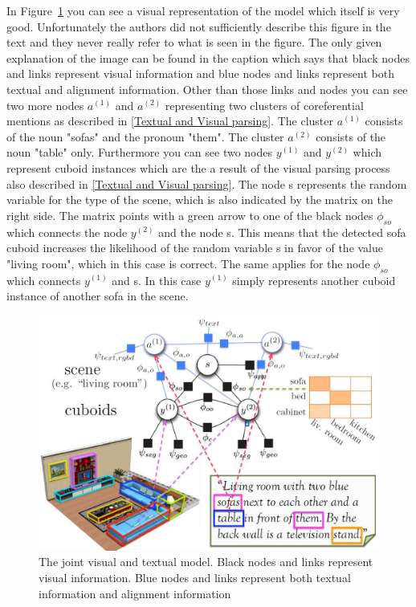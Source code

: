 \documentclass{utue} %
\begin{document}
In Figure~\ref{fig:model} you can see a visual representation of the model which itself is very good. Unfortunately the authors did not sufficiently describe this figure in the text and they never really refer to what is seen in the figure. The only given explanation of the image can be found in the caption which says that black nodes and links represent visual information and blue nodes and links represent both textual and alignment information. 
Other than those links and nodes you can see two more nodes $a^{(1)}$ and $a^{(2)}$ representing two clusters of coreferential mentions as described in \ref{Textual and Visual parsing}. The cluster $a^{(1)}$ consists of the noun "sofas" and the pronoun "them". The cluster $a^{(2)}$ consists of the noun "table" only. Furthermore you can see two nodes $y^{(1)}$ and $y^{(2)}$ which represent cuboid instances which are the a result of the visual parsing process also described in \ref{Textual and Visual parsing}. 
The node s represents the random variable for the type of the scene, which is also indicated by the matrix on the right side. The matrix points with a green arrow to one of the black nodes $\phi_{so}$ which connects the node $y^{(2)}$ and the node s. This means that the detected sofa cuboid increases the likelihood of the random variable s in favor of the value "living room", which in this case is correct. The same applies for the node $\phi_{so}$ which connects $y^{(1)}$ and s. In this case $y^{(1)}$ simply represents another cuboid instance of another sofa in the scene.

\begin{figure}[h!]
  \centering
  \includegraphics[width=1.5\columnwidth]{images/model.jpg}
  \caption{\label{fig:model}The joint visual and textual model. Black nodes and links represent visual information. Blue nodes and links represent both textual information and alignment information}
\end{figure}
\end{document}
